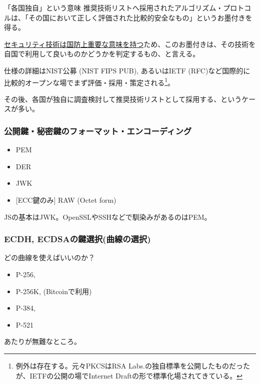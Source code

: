 \documentclass[12pt,dvipdfmx]{beamer}
\newcommand{\backupbegin}{
   \newcounter{framenumberappendix}
   \setcounter{framenumberappendix}{\value{framenumber}}
}
\newcommand{\backupend}{
   \addtocounter{framenumberappendix}{-\value{framenumber}}
   \addtocounter{framenumber}{\value{framenumberappendix}} 
}
\begin{document}
\begin{frame}
\small
 
\begin{block}{\small 「各国独自」という意味}
推奨技術リストへ採用されたアルゴリズム・プロトコルは、「その国において正しく評価された比較的安全なもの」というお墨付きを得る。


\underline{セキュリティ技術は国防上重要な意味を持つ}ため、このお墨付きは、その技術を自国で利用して良いものかどうかを判定するもの、と言える。
\end{block}

仕様の詳細はNIST公募 (NIST FIPS PUB), あるいはIETF (RFC)など国際的に比較的オープンな場でまず評価・採用・策定される\footnote[frame]{\scriptsize 例外は存在する。元々PKCSはRSA Labs.の独自標準を公開したものだったが、IETFの公開の場でInternet Draftの形で標準化場されてきている。}。

\vspace{1ex}

その後、各国が独自に調査検討して推奨技術リストとして採用する、というケースが多い。


\end{frame}

\begin{frame}
\frametitle{公開鍵・秘密鍵のフォーマット・エンコーディング}
\begin{itemize}
 \item PEM
 \item DER
 \item JWK
 \item {[ECC鍵のみ]}  RAW (Octet form)
\end{itemize}
JSの基本はJWK。OpenSSLやSSHなどで馴染みがあるのはPEM。
\end{frame}

\begin{frame}
\frametitle{ECDH, ECDSAの鍵選択(曲線の選択)}
どの曲線を使えばいいのか？
\begin{itemize}
 \item P-256,
 \item P-256K, (Bitcoinで利用)
 \item P-384,
 \item P-521
\end{itemize}
あたりが無難なところ。
\end{frame}







 

\end{document}
